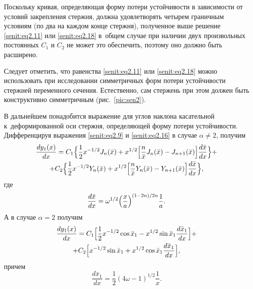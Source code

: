 \smallskip

\hypertarget{senit:p3}{}

Поскольку кривая, определяющая форму потери устойчивости в
зависимости от условий закрепления стержня, должна удовлетворять
четырем граничным условиям (по два на каждом конце стержня), 
полученное выше решение \eqref{senit:eq2.11} или \eqref{senit:eq2.18} в~общем случае при наличии двух произвольных постоянных $C_1$ и $C_2$ не может это обеспечить, поэтому оно должно быть расширено.

Следует отметить,  что равенства \eqref{senit:eq2.11} или \eqref{senit:eq2.18} можно использовать при исследовании симметричных форм потери устойчивости стержней переменного сечения. 
Естественно, сам стержень при этом должен быть конструктивно симметричным (рис.~\ref{pic:sen2}).

В дальнейшем понадобится выражение для углов наклона касательной к~деформированной оси стержня, определяющей форму потери устойчивости. 
Дифференцируя выражения \eqref{senit:eq2.9} и \eqref{senit:eq2.16} в случае $\alpha \ne 2$, получим
\begin{multline}
\label{senit:eq3.1} \frac{dy_1 ( x )}{dx}=C_1 \Bigl\{
\frac{1}{2}x^{-{1}/{2}}J_n (\bar {x} )+x^{{1}/{2}}
\Bigl[
\frac{n}{\bar {x}}J_n (\bar {x} )-J_{n+1} (\bar {x})
\Bigr]
\frac{d\bar {x}}{dx}\Bigr\}+ \\
+ C_2 
\Bigl\{ \frac{1}{2} x^{-{1}/{2}} Y_n (\bar{x})+x^{{1}/{2}}
\Bigl[ \frac{n}{\bar {x}}Y_n (\bar {x})-Y_{n+1} (
\bar {x})\Bigr]\frac{d\bar {x}}{dx} \Bigr\},
\end{multline}
где
\begin{equation}
\label{senit:eq3.2} \frac{d\bar {x}}{dx}=\omega
^{{1}/{2}}\Bigl( \frac{x}{a}
\Bigr)^{({1-2n})/{2n}}\frac{1}{a}.
\end{equation}
А в случае $\alpha = 2$ получим
\begin{multline}
\label{senit:eq3.3} \frac{dy_1 ( x )}{dx}=C_1 \Bigl[
\frac{1}{2}x^{-{1}/{2}}\cos \bar {x}_1 -x^{{1}/{2}}\sin
\bar{x}_1\frac{d \bar {x}_1}{dx}\Bigr]+\\
+C_2 \Bigl[
x^{-{1}/{2}}\sin \bar {x}_1 +x^{{1}/{2}}\cos \bar {x}_1
\frac{d \bar {x}_1}{dx} \Bigr],
\end{multline}
причем
\begin{equation}
\label{senit:eq3.4} 
\frac{d\bar {x}_1 }{dx}=\frac{1}{2}
( 4\omega -1 )^{{1}/{2}}\frac{1}{x}.
\end{equation}

